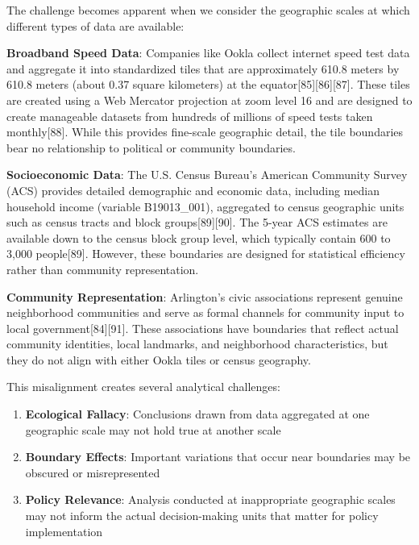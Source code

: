 \documentclass[
  letterpaper,
  DIV=11,
  numbers=noendperiod]{scrartcl}
\providecommand{\tightlist}{%
  \setlength{\itemsep}{0pt}\setlength{\parskip}{0pt}}
\begin{document}
The challenge becomes apparent when we consider the geographic scales at
which different types of data are available:

\textbf{Broadband Speed Data}: Companies like Ookla collect internet
speed test data and aggregate it into standardized tiles that are
approximately 610.8 meters by 610.8 meters (about 0.37 square
kilometers) at the equator{[}85{]}{[}86{]}{[}87{]}. These tiles are
created using a Web Mercator projection at zoom level 16 and are
designed to create manageable datasets from hundreds of millions of
speed tests taken monthly{[}88{]}. While this provides fine-scale
geographic detail, the tile boundaries bear no relationship to political
or community boundaries.

\textbf{Socioeconomic Data}: The U.S. Census Bureau's American Community
Survey (ACS) provides detailed demographic and economic data, including
median household income (variable B19013\_001), aggregated to census
geographic units such as census tracts and block groups{[}89{]}{[}90{]}.
The 5-year ACS estimates are available down to the census block group
level, which typically contain 600 to 3,000 people{[}89{]}. However,
these boundaries are designed for statistical efficiency rather than
community representation.

\textbf{Community Representation}: Arlington's civic associations
represent genuine neighborhood communities and serve as formal channels
for community input to local government{[}84{]}{[}91{]}. These
associations have boundaries that reflect actual community identities,
local landmarks, and neighborhood characteristics, but they do not align
with either Ookla tiles or census geography.

This misalignment creates several analytical challenges:

\begin{enumerate}
\def\labelenumi{\arabic{enumi}.}
\tightlist
\item
  \textbf{Ecological Fallacy}: Conclusions drawn from data aggregated at
  one geographic scale may not hold true at another scale
\item
  \textbf{Boundary Effects}: Important variations that occur near
  boundaries may be obscured or misrepresented
\item
  \textbf{Policy Relevance}: Analysis conducted at inappropriate
  geographic scales may not inform the actual decision-making units that
  matter for policy implementation
\end{enumerate}
\end{document}
